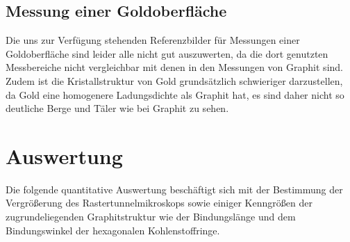 \documentclass[10pt, a4paper]{article}
\begin{document}
\subsection{Messung einer Goldoberfläche}
Die uns zur Verfügung stehenden Referenzbilder für Messungen einer Goldoberfläche sind leider alle nicht gut auszuwerten, da die dort genutzten Messbereiche nicht vergleichbar mit denen in den Messungen von Graphit sind.
Zudem ist die Kristallstruktur von Gold grundsätzlich schwieriger darzustellen, da Gold eine homogenere Ladungsdichte als Graphit hat, es sind daher nicht so deutliche Berge und Täler wie bei Graphit zu sehen. 

\section{Auswertung}
Die folgende quantitative Auswertung beschäftigt sich mit der Bestimmung der Vergrößerung des Rastertunnelmikroskops sowie einiger Kenngrößen der zugrundeliegenden Graphitstruktur wie der Bindungslänge und dem Bindungswinkel der hexagonalen Kohlenstoffringe.
\end{document}
